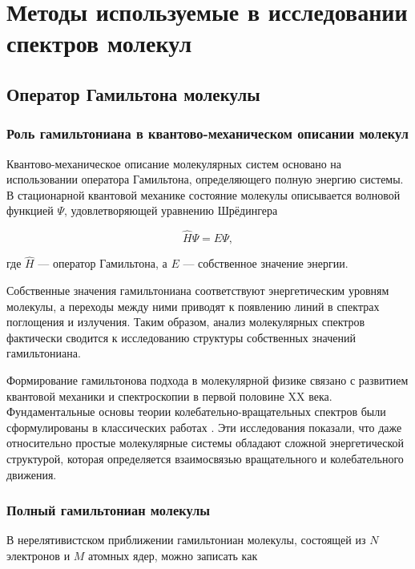 \chapter{Методы используемые в исследовании спектров молекул}\label{ch:methods}

\section{Оператор Гамильтона молекулы}\label{sec:methods/hamilton}

\subsection{Роль гамильтониана в квантово-механическом описании молекул}

Квантово-механическое описание молекулярных систем основано на использовании
оператора Гамильтона, определяющего полную энергию системы.
В стационарной квантовой механике состояние молекулы описывается
волновой функцией $\Psi$, удовлетворяющей уравнению Шрёдингера

\begin{equation}
\hat{H}\Psi = E\Psi ,
\end{equation}

где $\hat{H}$ — оператор Гамильтона, а $E$ — собственное значение энергии.

Собственные значения гамильтониана соответствуют энергетическим уровням
молекулы, а переходы между ними приводят к появлению линий в спектрах
поглощения и излучения. Таким образом, анализ молекулярных спектров
фактически сводится к исследованию структуры собственных значений
гамильтониана.

Формирование гамильтонова подхода в молекулярной физике связано
с развитием квантовой механики и спектроскопии в первой половине XX века.
Фундаментальные основы теории колебательно-вращательных спектров
были сформулированы в классических работах
\cite{nielsen,Amat1971,Makushkin1984}.
Эти исследования показали, что даже относительно простые молекулярные
системы обладают сложной энергетической структурой,
которая определяется взаимосвязью вращательного и колебательного движения.

\subsection{Полный гамильтониан молекулы}

В нерелятивистском приближении гамильтониан молекулы,
состоящей из $N$ электронов и $M$ атомных ядер, можно записать как

